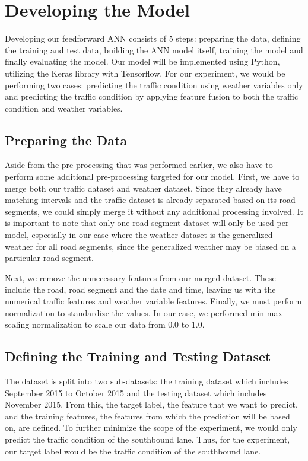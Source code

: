 \section{Developing the Model}
Developing our feedforward ANN consists of 5 steps: preparing the data, defining the training and test data, building the ANN model itself, training the model and finally evaluating the model. Our model will be implemented using Python, utilizing the Keras library with Tensorflow. For our experiment, we would be performing two cases: predicting the traffic condition using weather variables only and predicting the traffic condition by applying feature fusion to both the traffic condition and weather variables.

\subsection{Preparing the Data}
Aside from the pre-processing that was performed earlier, we also have to perform some additional pre-processing targeted for our model. First, we have to merge both our traffic dataset and weather dataset. Since they already have matching intervals and the traffic dataset is already separated based on its road segments, we could simply merge it without any additional processing involved. It is important to note that only one road segment dataset will only be used per model, especially in our case where the weather dataset is the generalized weather for all road segments, since the generalized weather may be biased on a particular road segment.



Next, we remove the unnecessary features from our merged dataset. These include the road, road segment and the date and time, leaving us with the numerical traffic features and weather variable features. Finally, we must perform normalization to standardize the values. In our case, we performed min-max scaling normalization to scale our data from 0.0 to 1.0.



\subsection{Defining the Training and Testing Dataset}
The dataset is split into two sub-datasets: the training dataset which includes September 2015 to October 2015 and the testing dataset which includes November 2015. From this, the target label, the feature that we want to predict, and the training features, the features from which the prediction will be based on, are defined. To further minimize the scope of the experiment, we would only predict the traffic condition of the southbound lane. Thus, for the experiment, our target label would be the traffic condition of the southbound lane.

